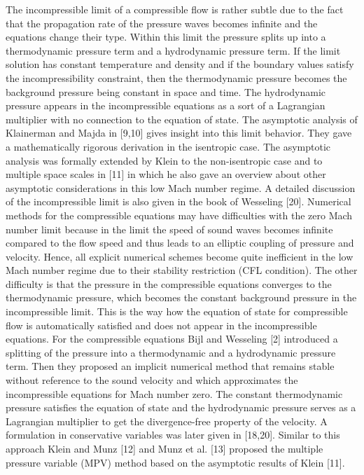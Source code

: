 \documentclass[preprint,10pt]{elsarticle}
\begin{document}
The incompressible limit of a compressible flow is rather subtle due to the fact that the propagation rate of
the pressure waves becomes infinite and the equations change their type. Within this limit the pressure splits up
into a thermodynamic pressure term and a hydrodynamic pressure term. If the limit solution has constant
temperature and density and if the boundary values satisfy the incompressibility constraint, then the
thermodynamic pressure becomes the background pressure being constant in space and time. The hydrodynamic
pressure appears in the incompressible equations as a sort of a Lagrangian multiplier with no connection
to the equation of state. The asymptotic analysis of Klainerman and Majda in [9,10] gives insight into this
limit behavior. They gave a mathematically rigorous derivation in the isentropic case. The asymptotic analysis
was formally extended by Klein to the non-isentropic case and to multiple space scales in [11] in which he also
gave an overview about other asymptotic considerations in this low Mach number regime. A detailed discussion
of the incompressible limit is also given in the book of Wesseling [20].
Numerical methods for the compressible equations may have difficulties with the zero Mach number limit
because in the limit the speed of sound waves becomes infinite compared to the flow speed and thus leads to an
elliptic coupling of pressure and velocity. Hence, all explicit numerical schemes become quite inefficient in the
low Mach number regime due to their stability restriction (CFL condition). The other difficulty is that the
pressure in the compressible equations converges to the thermodynamic pressure, which becomes the constant
background pressure in the incompressible limit. This is the way how the equation of state for compressible
flow is automatically satisfied and does not appear in the incompressible equations. For the compressible
equations Bijl and Wesseling [2] introduced a splitting of the pressure into a thermodynamic and a hydrodynamic
pressure term. Then they proposed an implicit numerical method that remains stable without reference
to the sound velocity and which approximates the incompressible equations for Mach number zero. The constant
thermodynamic pressure satisfies the equation of state and the hydrodynamic pressure serves as a
Lagrangian multiplier to get the divergence-free property of the velocity. A formulation in conservative variables
was later given in [18,20]. Similar to this approach Klein and Munz [12] and Munz et al. [13] proposed
the multiple pressure variable (MPV) method based on the asymptotic results of Klein [11].
\end{document}
